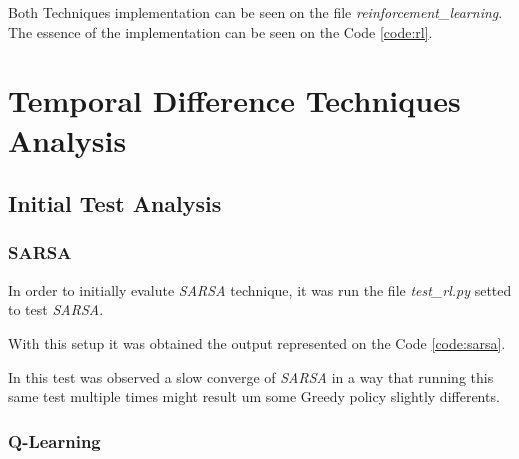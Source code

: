 \documentclass[journal]{IEEEtran}
\begin{document}
Both Techniques implementation can be seen on the file \textit{reinforcement\_learning}. The essence of the implementation can be seen on the Code \ref{code:rl}.



% 

\section{Temporal Difference Techniques Analysis}

\subsection{Initial Test Analysis}

\subsubsection{SARSA}

In order to initially evalute \textit{SARSA} technique, it was run the file \textit{test\_rl.py} setted to test \textit{SARSA}.

With this setup it was obtained the output represented on the Code \ref{code:sarsa}.



In this test was observed a slow converge of \textit{SARSA} in a way that running this same test multiple times might result um some Greedy policy slightly differents.

\subsubsection{Q-Learning}
\end{document}
